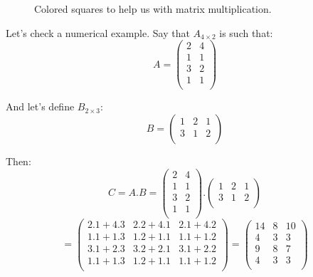 \documentclass[a4,12pt,twosided,openany]{memoir}
\begin{document}
\begin{figure}[h!]
\begin{center}
\end{center}
\vspace*{3pt}
\caption{Colored squares to help us with matrix multiplication.}
\end{figure}
\par 
\indent
Let's check a numerical example. Say that $A_{4 \times 2}$ is such that:
\[
A = \begin{pmatrix}
2 & 4  \\
1 & 1  \\
3 & 2  \\
1 & 1  \\
\end{pmatrix}
\]
\par 
\indent
And let's define $B_{2 \times 3}$:
\[B = \begin{pmatrix}
1 & 2 & 1   \\
3 & 1 & 2  \\
\end{pmatrix}
\]
\par 
\indent
Then:
\[
C = A.B =  \begin{pmatrix}
2 & 4  \\
1 & 1  \\
3 & 2  \\
1 & 1  \\
\end{pmatrix}.\begin{pmatrix}
1 & 2 & 1   \\
3 & 1 & 2  \\
\end{pmatrix}
\]
\[
 =  \begin{pmatrix}
2.1 + 4.3 & 2.2 + 4.1 & 2.1 + 4.2 \\
1.1 + 1.3 & 1.2 + 1.1 & 1.1 + 1.2 \\
3.1 + 2.3 & 3.2 + 2.1 & 3.1 + 2.2 \\
1.1 + 1.3 & 1.2 + 1.1 & 1.1 + 1.2 \\ 
\end{pmatrix}
= 
\begin{pmatrix}
14 & 8 & 10   \\
4 & 3 & 3 \\
9 & 8 & 7 \\
4 & 3 & 3 \\
\end{pmatrix}
\]
\end{document}
